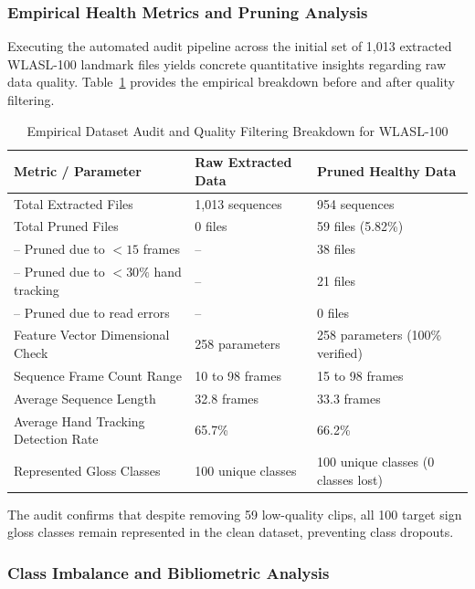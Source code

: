 \documentclass[12pt,a4paper]{article}
\begin{document}
\subsubsection{Empirical Health Metrics and Pruning Analysis}

Executing the automated audit pipeline across the initial set of 1,013 extracted WLASL-100 landmark files yields concrete quantitative insights regarding raw data quality. Table~\ref{tab:pruning_summary} provides the empirical breakdown before and after quality filtering.

\begin{table}[h]
\centering
\caption{Empirical Dataset Audit and Quality Filtering Breakdown for WLASL-100}
\label{tab:pruning_summary}
\small
\begin{tabular}{l l l}
\toprule
\textbf{Metric / Parameter} & \textbf{Raw Extracted Data} & \textbf{Pruned Healthy Data} \\
\midrule
Total Extracted Files & 1,013 sequences & 954 sequences \\
Total Pruned Files & 0 files & 59 files (5.82\%) \\
\quad -- Pruned due to $<15$ frames & -- & 38 files \\
\quad -- Pruned due to $<30\%$ hand tracking & -- & 21 files \\
\quad -- Pruned due to read errors & -- & 0 files \\
Feature Vector Dimensional Check & 258 parameters & 258 parameters (100\% verified) \\
Sequence Frame Count Range & 10 to 98 frames & 15 to 98 frames \\
Average Sequence Length & 32.8 frames & 33.3 frames \\
Average Hand Tracking Detection Rate & 65.7\% & 66.2\% \\
Represented Gloss Classes & 100 unique classes & 100 unique classes (0 classes lost) \\
\bottomrule
\end{tabular}
\end{table}

The audit confirms that despite removing 59 low-quality clips, all 100 target sign gloss classes remain represented in the clean dataset, preventing class dropouts. 

\subsubsection{Class Imbalance and Bibliometric Analysis}
\end{document}
